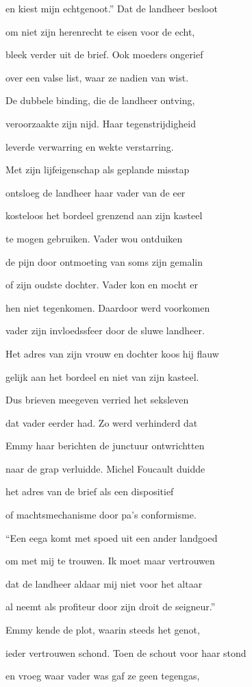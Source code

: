 en kiest mijn echtgenoot.”
Dat de landheer besloot

om niet zijn herenrecht
te eisen voor de echt,

bleek verder uit de brief.
Ook moeders ongerief

over een valse list,
waar ze nadien van wist.

De dubbele binding,
die de landheer ontving,

veroorzaakte zijn nijd.
Haar tegenstrijdigheid

leverde verwarring
en wekte verstarring.

Met zijn lijfeigenschap
als geplande misstap

ontsloeg de landheer
haar vader van de eer

kosteloos het bordeel
grenzend aan zijn kasteel

te mogen gebruiken.
Vader wou ontduiken

de pijn door ontmoeting
van soms zijn gemalin

of zijn oudste dochter.
Vader kon en mocht er

hen niet tegenkomen.
Daardoor werd voorkomen

vader zijn invloedssfeer
door de sluwe landheer.

Het adres van zijn vrouw
en dochter koos hij flauw

gelijk aan het bordeel
en niet van zijn kasteel.

Dus brieven meegeven
verried het seksleven

dat vader eerder had.
Zo werd verhinderd dat

Emmy haar berichten
de junctuur ontwrichtten

naar de grap verluidde.
Michel Foucault duidde

het adres van de brief
als een dispositief

of machtsmechanisme
door pa’s conformisme.

“Een eega komt met spoed
uit een ander landgoed

om met mij te trouwen.
Ik moet maar vertrouwen

dat de landheer aldaar
mij niet voor het altaar

al neemt als profiteur
door zijn droit de seigneur.”

Emmy kende de plot,
waarin steeds het genot,

ieder vertrouwen schond.
Toen de schout voor haar stond

en vroeg waar vader was
gaf ze geen tegengas,

